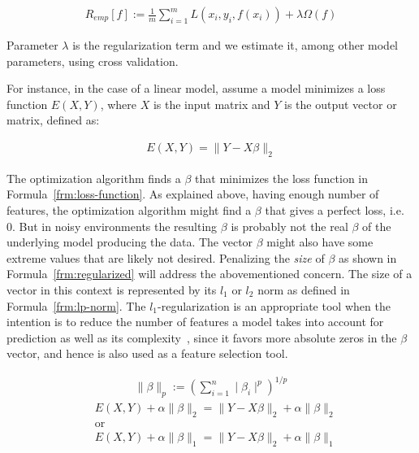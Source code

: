 \begin{align}
  R_{emp}[f] := \frac{1}{m}\sum_{i = 1}^{m} L(x_i, y_i, f(x_i)) + \lambda \Omega(f)
  \label{frm:bkg:emp-regularized}
\end{align}

Parameter $\lambda$ is the regularization term and we estimate it, among other model parameters, using cross validation.

For instance, in the case of a linear model, assume a model minimizes a loss function $E(X, Y)$, where $X$ is the input matrix and $Y$ is the output vector or matrix, defined as:

\begin{align}
  E(X, Y) = \parallel Y - X \beta \parallel_2
  \label{frm:loss-function}
\end{align}

The optimization algorithm finds a $\beta$ that minimizes the loss function in Formula~\ref{frm:loss-function}. As explained above, having enough number of features, the optimization algorithm might find a $\beta$ that gives a perfect loss, i.e. 0. But in noisy environments the resulting $\beta$ is probably not the real $\beta$ of the underlying model producing the data. The vector $\beta$ might also have some extreme values that are likely not desired. Penalizing the \emph{size} of $\beta$ as shown in Formula~\ref{frm:regularized} will address the abovementioned concern. The size of a vector in this context is represented by its $l_1$ or $l_2$ norm as defined in Formula~\ref{frm:lp-norm}. The $l_1$-regularization is an appropriate tool when the intention is to reduce the number of features a model takes into account for prediction as well as its complexity~\cite{l1-regularized}, since it favors more absolute zeros in the $\beta$ vector, and hence is also used as a feature selection tool.

\begin{align}
  \parallel \beta \parallel_p := \left(\sum\limits_{i=1}^n \mid \beta_i \mid^p \right)^{1/p}
  \label{frm:lp-norm}
\end{align}
\begin{align}
  &E(X, Y) + \alpha \parallel \beta \parallel_2 = \parallel Y - X \beta \parallel_2 + \alpha \parallel \beta \parallel_2 \nonumber \\
  &\text{or} \nonumber \\
  &E(X, Y) + \alpha \parallel \beta \parallel_1 = \parallel Y - X \beta \parallel_2 + \alpha \parallel \beta \parallel_1
  \label{frm:regularized}
\end{align}

